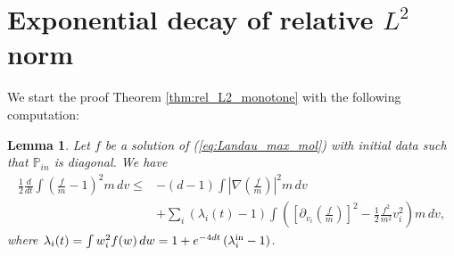 \documentclass[11pt]{amsart}
\numberwithin{equation}{section}
\newtheorem{lemma}{Lemma}
\begin{document}
\section{Exponential decay of relative $L^2$ norm}\label{sec:rel_L2}
We start the proof Theorem \ref{thm:rel_L2_monotone} with the following computation: 
\begin{lemma}\label{lem:ineq_lambda_minus1}
  Let $f$ be a solution of (\ref{eq:Landau_max_mol}) with initial data such that $\mathbb{P}_{in}$ is diagonal. We have
  \begin{align*}
    \frac{1}{2}\frac{d}{dt}\int\left(\frac{f}{ m }-1\right)^{2} m \,dv \leq 
   & -(d-1)\int \left\vert\nabla\left(\frac{f}{ m } \right)\right\vert^{2} m \,dv \\
   & +\sum_{i}(\lambda_{i}(t) -1)\int\left(\left[\partial_{v_{i}}\left(\frac{f}{ m } \right)\right]^{2}-\frac{1}{2}\frac{f^{2}}{ m ^{2}}v_{i}^{2}\right) m\,dv,
  \end{align*}
  where $\lambda_{i}(t)=\int w_i^2 f(w)\,dw=1+e^{-4dt}\left(\lambda_{i}^{\textnormal{in}}-1\right)$.
\end{lemma}
%
\end{document}
